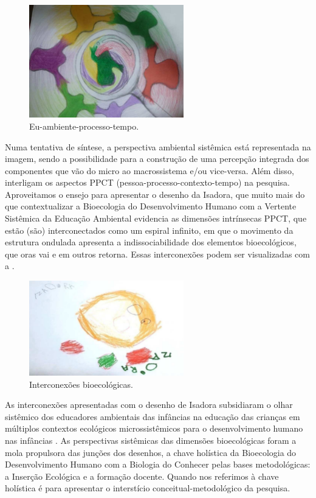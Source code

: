 \documentclass{textolivre}
\begin{document}
\begin{figure}[h!]
 \centering
 \includegraphics[width=0.6\textwidth]{figure05.pdf}
 \caption{Eu-ambiente-processo-tempo.}
 \label{fig-fig05}
\end{figure}


Numa tentativa de síntese, a perspectiva ambiental sistêmica está representada na imagem, sendo a possibilidade para a construção de uma percepção integrada dos componentes que vão do micro ao macrossistema e/ou vice-versa. Além disso, interligam os aspectos PPCT (pessoa-processo-contexto-tempo) na pesquisa. Aproveitamos o ensejo para apresentar o desenho da Isadora, que muito mais do que contextualizar a Bioecologia do Desenvolvimento Humano com a Vertente Sistêmica da Educação Ambiental evidencia as dimensões intrínsecas PPCT, que estão (são) interconectados como um espiral infinito, em que o movimento da estrutura ondulada apresenta a indissociabilidade dos elementos bioecológicos, que oras vai e em outros retorna. Essas interconexões podem ser visualizadas com a .

\begin{figure}[h!]
 \centering
 \includegraphics[width=0.6\textwidth]{figure06.pdf}
 \caption{Interconexões bioecológicas.}
 \label{fig-fig06}
\end{figure}

As interconexões apresentadas com o desenho de Isadora subsidiaram o olhar sistêmico dos educadores ambientais das infâncias na educação das crianças em múltiplos contextos ecológicos microssistêmicos para o desenvolvimento humano nas infâncias \cite{piske2019}. As perspectivas sistêmicas das dimensões bioecológicas foram a mola propulsora das junções dos desenhos, a chave holística da Bioecologia do Desenvolvimento Humano \cite{brofen2011} com a Biologia do Conhecer \cite{maturana2011} pelas bases metodológicas: a Inserção Ecológica e a formação docente. Quando nos referimos à chave holística é para apresentar o interstício conceitual-metodológico da pesquisa. 
\end{document}
